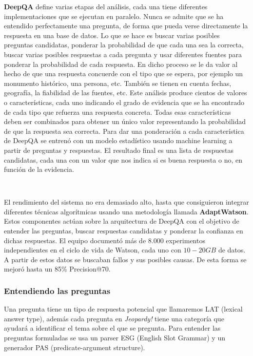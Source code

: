 \documentclass[paper=a4, fontsize=10pt]{scrartcl} %
\numberwithin{equation}{section} %
\numberwithin{figure}{section} %
\numberwithin{table}{section} %
\begin{document}
\textbf{DeepQA} define varias etapas del análisis, cada una tiene diferentes implementaciones que se ejecutan en paralelo.  
Nunca se admite que se ha entendido perfectamente una pregunta, de forma que pueda verse directamente la respuesta en una base de datos.
Lo que se hace es buscar varias posibles preguntas candidatas, ponderar la probabilidad de que cada una sea la correcta, buscar varias posibles respuestas a cada pregunta y usar diferentes fuentes para ponderar la probabilidad de cada respuesta.
En dicho proceso se le da valor al hecho de que una respuesta concuerde con el tipo que se espera, por ejemplo un monumento histórico, una persona, etc.
También se tienen en cuenta fechas, geografía, la fiabilidad de las fuentes, etc.
Este análisis produce cientos de valores o características, cada uno indicando el grado de evidencia que se ha encontrado de cada tipo que refuerza una respuesta concreta.
Todas esas características deben ser combinados para obtener un único valor representando la probabilidad de que la respuesta sea correcta.
Para dar una ponderación a cada característica de DeepQA se entrenó con un modelo estadístico usando machine learning a partir de preguntas y respuestas.
El resultado final es una lista de respuestas candidatas, cada una con un valor que nos indica si es buena respuesta o no, en función de la evidencia.

\

El rendimiento del sistema no era demasiado alto, hasta que consiguieron integrar diferentes técnicas algorítmicas usando una metodología llamada \textbf{AdaptWatson}.
Estos componentes actúan sobre la arquitectura de DeepQA con el objetivo de entender las preguntas, buscar respuestas candidatas y ponderar la confianza en dichas respuestas.
El equipo documentó más de $8.000$ experimentos independientes en el ciclo de vida de Watson, cada uno con $10-20GB$ de datos.
A partir de estos datos se buscaban fallos y sus posibles causas.
De esta forma se mejoró hasta un 85\% Precision@70.

\subsubsection{Entendiendo las preguntas}
Una pregunta tiene un tipo de respuesta potencial que llamaremos LAT (lexical answer type), además cada pregunta en \textit{Jeopardy!} tiene una categoría que ayudará a identificar el tema sobre el que se pregunta. %
Para entender las preguntas formuladas se usa un parser ESG (English Slot Grammar) %
y un generador PAS (predicate-argument structure). 
\end{document}
